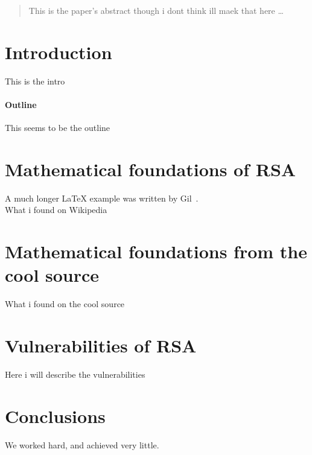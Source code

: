 \documentclass[12pt, a4paper]{article}
\begin{document}
\begin{abstract}
This is the paper's abstract though i dont think ill maek that here \ldots
\end{abstract}

\section{Introduction}
This is the intro
\paragraph{Outline}
This seems to be the outline

\section{Mathematical foundations of RSA}\label{mathematical foundations of RSA}
A much longer \LaTeX{} example was written by Gil~\cite{Gil:02}.\\
What i found on Wikipedia

\section{Mathematical foundations from the cool source}\label{mathematical foundations from cool source}
What i found on the cool source

\section{Vulnerabilities of RSA}\label{vulnerabilities of RSA}
Here i will describe the vulnerabilities

\section{Conclusions}\label{conclusions}
We worked hard, and achieved very little.



\end{document}
